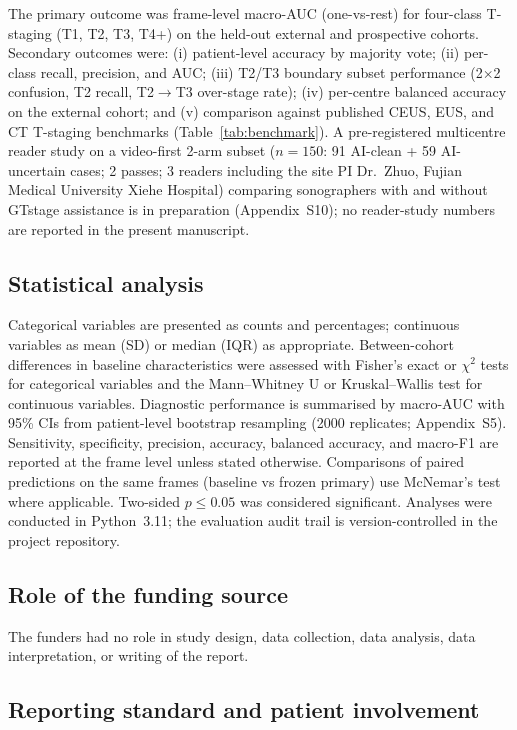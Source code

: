 \documentclass[11pt,a4paper]{article}
\begin{document}
The primary outcome was frame-level macro-AUC (one-vs-rest) for four-class T-staging (T1, T2, T3, T4+) on the held-out external and prospective cohorts. Secondary outcomes were: (i) patient-level accuracy by majority vote; (ii) per-class recall, precision, and AUC; (iii) T2/T3 boundary subset performance (2$\times$2 confusion, T2 recall, T2$\to$T3 over-stage rate); (iv) per-centre balanced accuracy on the external cohort; and (v) comparison against published CEUS, EUS, and CT T-staging benchmarks (Table~\ref{tab:benchmark}). A pre-registered multicentre reader study on a video-first 2-arm subset ($n=150$: 91 AI-clean + 59 AI-uncertain cases; 2 passes; 3 readers including the site PI Dr.~Zhuo, Fujian Medical University Xiehe Hospital) comparing sonographers with and without GTstage assistance is in preparation (Appendix~S10); no reader-study numbers are reported in the present manuscript.

\subsection{Statistical analysis}

Categorical variables are presented as counts and percentages; continuous variables as mean (SD) or median (IQR) as appropriate. Between-cohort differences in baseline characteristics were assessed with Fisher's exact or $\chi^2$ tests for categorical variables and the Mann--Whitney U or Kruskal--Wallis test for continuous variables. Diagnostic performance is summarised by macro-AUC with 95\% CIs from patient-level bootstrap resampling (2000 replicates; Appendix~S5). Sensitivity, specificity, precision, accuracy, balanced accuracy, and macro-F1 are reported at the frame level unless stated otherwise. Comparisons of paired predictions on the same frames (baseline vs frozen primary) use McNemar's test where applicable. Two-sided $p\leq 0.05$ was considered significant. Analyses were conducted in Python~3.11; the evaluation audit trail is version-controlled in the project repository.

\subsection{Role of the funding source}

The funders had no role in study design, data collection, data analysis, data interpretation, or writing of the report.

\subsection{Reporting standard and patient involvement}
\label{sec:patient-involve}
\end{document}
